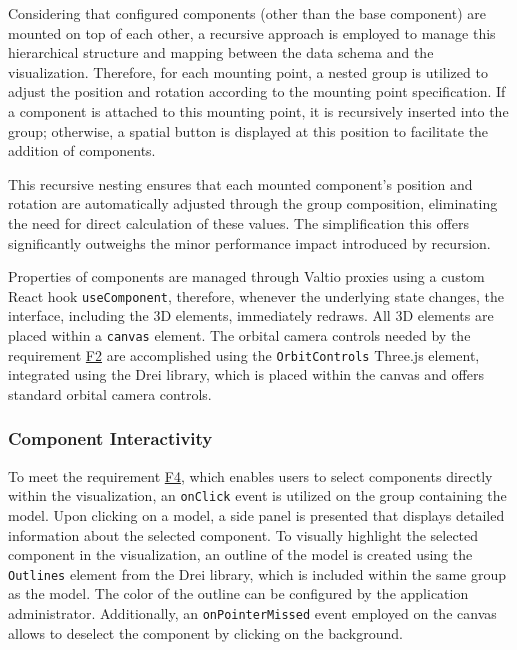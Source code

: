 Considering that configured components (other than the base component) are mounted on top of each other, a recursive approach is employed to manage this hierarchical structure and mapping between the data schema and the visualization. Therefore, for each mounting point, a nested group is utilized to adjust the position and rotation according to the mounting point specification. If a component is attached to this mounting point, it is recursively inserted into the group; otherwise, a spatial button is displayed at this position to facilitate the addition of components. 

This recursive nesting ensures that each mounted component's position and rotation are automatically adjusted through the group composition, eliminating the need for direct calculation of these values. The simplification this offers significantly outweighs the minor performance impact introduced by recursion.

Properties of components are managed through Valtio proxies using a custom React hook \texttt{useComponent}, therefore, whenever the underlying state changes, the interface, including the 3D elements, immediately redraws.
All 3D elements are placed within a  \texttt{canvas} element. The orbital camera controls needed by the requirement \hyperref[itm:F2]{F2} are accomplished using the \texttt{OrbitControls} Three.js element, integrated using the Drei library, which is placed within the canvas and offers standard orbital camera controls.


\subsubsection{Component Interactivity}

To meet the requirement \hyperref[itm:F4]{F4}, which enables users to select components directly within the visualization, an \texttt{onClick} event is utilized on the group containing the model. Upon clicking on a model, a side panel is presented that displays detailed information about the selected component. To visually highlight the selected component in the visualization, an outline of the model is created using the \texttt{Outlines} element from the Drei library, which is included within the same group as the model. The color of the outline can be configured by the application administrator. Additionally, an \texttt{onPointerMissed} event employed on the canvas allows to deselect the component by clicking on the background.


